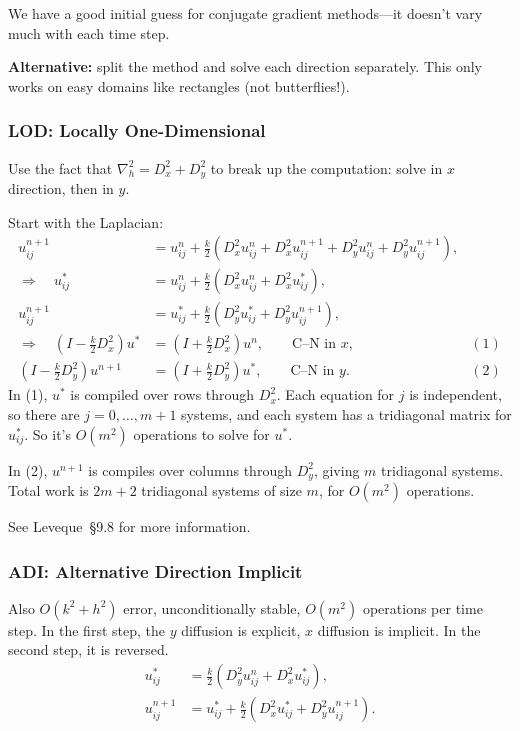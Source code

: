 \documentclass[12pt, a4paper]{article}
\theoremstyle{definition}
\theoremstyle{remark}
\numberwithin{equation}{section}
\begin{document}
We have a good initial guess for conjugate gradient methods---it doesn't vary
much with each time step.

\textbf{Alternative:} split the method and solve each direction separately.
This only works on easy domains like rectangles (not butterflies!). 



\newpage
\subsubsection{LOD: Locally One-Dimensional}

Use the fact that $\nabla_h^2 = D_x^2 + D_y^2$ to break up the computation:
solve in $x$ direction, then in $y$.

Start with the Laplacian:
\begin{align*}
u_{ij}^{n+1} &= u_{ij}^n + \tfrac{k}{2}(D_x^2 u_{ij}^n + D_x^2 u_{ij}^{n+1} +
D_y^2 u_{ij}^n + D_y^2 u_{ij}^{n+1}), \\
\Longrightarrow \quad
u_{ij}^\ast &= u_{ij}^n + \tfrac{k}{2}(D_x^2 u_{ij}^n + D_x^2 u_{ij}^\ast), \\
u_{ij}^{n+1} &= u_{ij}^\ast + \tfrac{k}{2}(D_y^2 u_{ij}^\ast + D_y^2 u_{ij}^{n+1}), \\
\Longrightarrow \quad 
(I - \tfrac{k}{2} D_x^2) u^\ast &= (I + \tfrac{k}{2} D_x^2) u^n, \qquad \text{C--N in $x$} ,& (1) \\
(I - \tfrac{k}{2} D_y^2) u^{n+1} &= (I + \tfrac{k}{2} D_y^2) u^\ast, \qquad \text{C--N in $y$}. & (2)
\end{align*}
In (1), $u^\ast$ is compiled over rows through $D_x^2$. Each equation for $j$ is
independent, so there are $j=0,\ldots,m+1$ systems, and each system has a tridiagonal
matrix for $u^\ast_{ij}$. So it's $O(m^2)$ operations to solve for $u^\ast$.

In (2), $u^{n+1}$ is compiles over columns through $D_y^2$, giving $m$ tridiagonal
systems. Total work is $2m+2$ tridiagonal systems of size $m$, for $O(m^2)$ operations.

See Leveque~\S9.8 for more information.

\newpage
\subsubsection{ADI: Alternative Direction Implicit}

Also $O(k^2+h^2)$ error, unconditionally stable, $O(m^2)$ operations per time step.
In the first step, the $y$ diffusion is explicit, $x$ diffusion is implicit. In the
second step, it is reversed.
\begin{align*}
u^\ast_{ij} &= \tfrac{k}{2}(D_y^2 u_{ij}^n + D_x^2 u^\ast_{ij}), \\
u^{n+1}_{ij} &= u^\ast_{ij} + \tfrac{k}{2}(D_x^2 u_{ij}^\ast + D_y^2 u_{ij}^{n+1}).
\end{align*}
\end{document}
